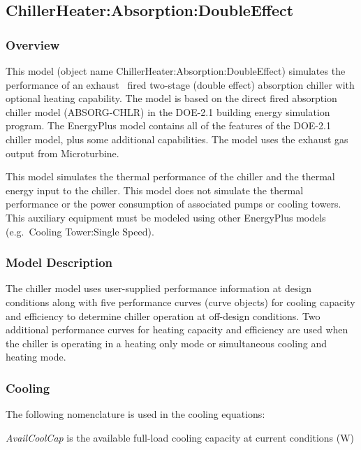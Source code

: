 \subsection{ChillerHeater:Absorption:DoubleEffect}\label{chillerheaterabsorptiondoubleeffect}

\subsubsection{Overview}\label{overview-1-003}

This model (object name ChillerHeater:Absorption:DoubleEffect) simulates the performance of an exhaust~ fired two-stage (double effect) absorption chiller with optional heating capability. The model is based on the direct fired absorption chiller model (ABSORG-CHLR) in the DOE-2.1 building energy simulation program. The EnergyPlus model contains all of the features of the DOE-2.1 chiller model, plus some additional capabilities. The model uses the exhaust gas output from Microturbine.

This model simulates the thermal performance of the chiller and the thermal energy input to the chiller. This model does not simulate the thermal performance or the power consumption of associated pumps or cooling towers. This auxiliary equipment must be modeled using other EnergyPlus models (e.g.~Cooling Tower:Single Speed).

\subsubsection{Model Description}\label{model-description-1-003}

The chiller model uses user-supplied performance information at design conditions along with five performance curves (curve objects) for cooling capacity and efficiency to determine chiller operation at off-design conditions. Two additional performance curves for heating capacity and efficiency are used when the chiller is operating in a heating only mode or simultaneous cooling and heating mode.

\subsubsection{Cooling}\label{cooling-1}

The following nomenclature is used in the cooling equations:

\emph{AvailCoolCap} is the available full-load cooling capacity at current conditions (W)

